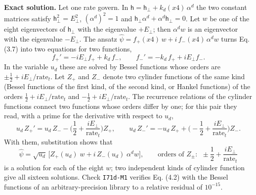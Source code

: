\documentclass[
  10pt,
]{article}
\begin{document}
\textbf{Exact solution.} Let one rate govern. In
\(\mathsf h=\mathsf h_\perp+k_d(x4)\,\alpha^d\) the two constant
matrices satisfy \(\mathsf h_\perp^2=E_\perp^2\), \((\alpha^d)^2=1\) and
\(\mathsf h_\perp\alpha^d+\alpha^d\mathsf h_\perp=0\). Let \(w\) be one
of the eight eigenvectors of \(\mathsf h_\perp\) with the eigenvalue
\(+E_\perp\); then \(\alpha^dw\) is an eigenvector with the eigenvalue
\(-E_\perp\). The ansatz \(\hat\psi=f_+(x4)\,w+i\,f_-(x4)\,\alpha^dw\)
turns Eq. (3.7) into two equations for two functions,
\[f_+'=-iE_\perp f_++k_d\,f_-,\qquad f_-'=-k_d\,f_++iE_\perp f_- .\] In
the variable \(u_d\) these are solved by Bessel functions whose orders
are \(\pm\tfrac12+iE_\perp/\mathrm{rate}_t\). Let \(Z_+\) and \(Z_-\)
denote two cylinder functions of the same kind (Bessel functions of the
first kind, of the second kind, or Hankel functions) of the orders
\(\tfrac12+iE_\perp/\mathrm{rate}_t\) and
\(-\tfrac12+iE_\perp/\mathrm{rate}_t\). The recurrence relations of the
cylinder functions connect two functions whose orders differ by one; for
this pair they read, with a prime for the derivative with respect to
\(u_d\),
\[u_d\,Z_+'=u_d\,Z_--\Big(\frac12+\frac{iE_\perp}{\mathrm{rate}_t}\Big)Z_+,\qquad
u_d\,Z_-'=-u_d\,Z_++\Big(-\frac12+\frac{iE_\perp}{\mathrm{rate}_t}\Big)Z_- .\]
With them, substitution shows that
\[\boxed{\;\hat\psi=\sqrt{u_d}\,\Big[Z_+(u_d)\;w+i\,Z_-(u_d)\;\alpha^dw\Big],\qquad
\text{orders of }Z_\pm:\ \ \pm\frac12+\frac{iE_\perp}{\mathrm{rate}_t}\;}\tag{4.2}\]
is a solution for each of the eight \(w\); two independent kinds of
cylinder function give all sixteen solutions. Check \texttt{I71d-M1}
verifies Eq. (4.2) with the Bessel functions of an arbitrary-precision
library to a relative residual of \(10^{-15}\).
\end{document}
